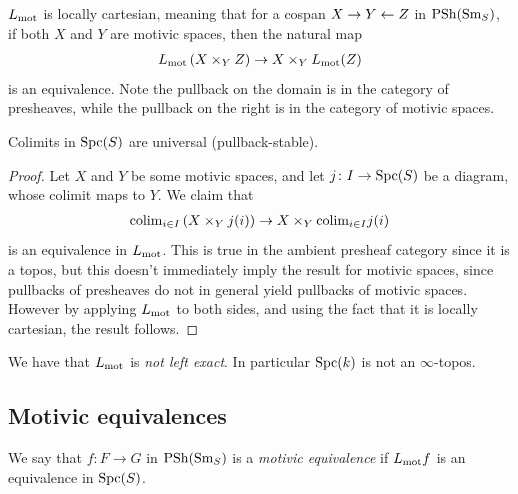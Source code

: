 \documentclass[11pt,openany]{book}
\begin{document}
\begin{proposition} \cite[3.15]{Hoyois6}
$L_{\mathrm{mot}}$ is locally cartesian, meaning that for a cospan $X \to Y \leftarrow Z$ in $\mathrm{PSh}(\mathrm{Sm}_S)$, if both $X$ and $Y$ are motivic spaces, then the natural map
\begin{align*}
    L_{\mathrm{mot}} \left( X \times_Y Z \right) \to X \times_Y L_{\mathrm{mot}}(Z)
\end{align*}
is an equivalence. Note the pullback on the domain is in the category of presheaves, while the pullback on the right is in the category of motivic spaces.
\end{proposition}

\begin{corollary}\label{cor:universal-colimits-motivic-spaces}
Colimits in $\mathrm{Spc}(S)$ are universal (pullback-stable). 
\end{corollary}
\begin{proof} Let $X$ and $Y$ be some motivic spaces, and let $j \colon I \to \mathrm{Spc}(S)$ be a diagram, whose colimit maps to $Y$. We claim that
\begin{align*}
    \mathrm{colim}_{i\in I} \left( X \times_Y j(i) \right) \to X \times_Y \mathrm{colim}_{i\in I} j(i)
\end{align*}
is an equivalence in $L_{\mathrm{mot}}$. This is true in the ambient presheaf category since it is a topos, but this doesn't immediately imply the result for motivic spaces, since pullbacks of presheaves do not in general yield pullbacks of motivic spaces. However by applying $L_{\mathrm{mot}}$ to both sides, and using the fact that it is locally cartesian, the result follows.
\end{proof}


\begin{proposition}\label{prop:spc-not-a-topos} 
We have that $L_{\mathrm{mot}}$ is \textit{not left exact}. In particular $\mathrm{Spc}(k)$ is not an $\infty$-topos.
\end{proposition}

\subsection{Motivic equivalences}


\begin{definition} We say that $f \colon F \to G$ in $\mathrm{PSh}(\mathrm{Sm}_S)$ is a \textit{motivic equivalence} if $L_{\mathrm{mot}} f$ is an equivalence in $\mathrm{Spc}(S)$.
\end{definition}
\end{document}
